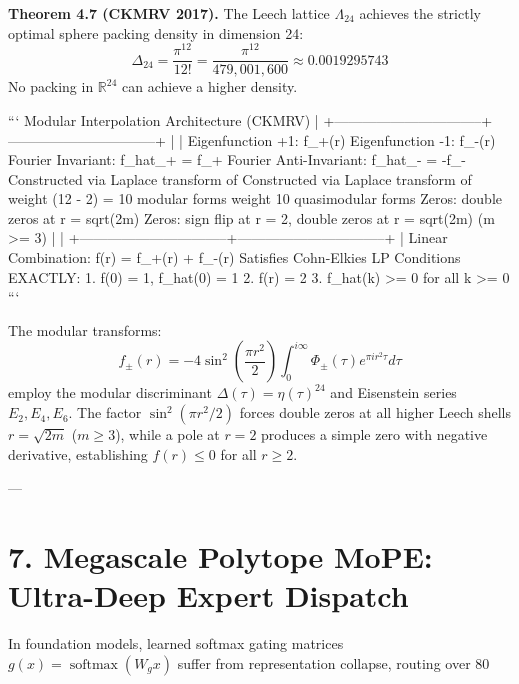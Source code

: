\documentclass[11pt,twoside,openright]{amsbook}
\begin{document}
\textbf{Theorem 4.7 (CKMRV 2017).}
The Leech lattice $\Lambda_{24}$ achieves the strictly optimal sphere packing density in dimension 24:
$$\Delta_{24} = \frac{\pi^{12}}{12!} = \frac{\pi^{12}}{479,001,600} \approx \mathbf{0.0019295743}$$
No packing in $\mathbb{R}^{24}$ can achieve a higher density.

```
                         Modular Interpolation Architecture (CKMRV)
                                             |
            +--------------------------------+--------------------------------+
            |                                                                 |
     Eigenfunction +1: f_+(r)                                          Eigenfunction -1: f_-(r)
  Fourier Invariant: f_hat_+ = f_+                                  Fourier Anti-Invariant: f_hat_- = -f_-
  Constructed via Laplace transform of                              Constructed via Laplace transform of
  weight (12 - 2) = 10 modular forms                                weight 10 quasimodular forms
  Zeros: double zeros at r = sqrt(2m)                               Zeros: sign flip at r = 2,
                                                                    double zeros at r = sqrt(2m) (m >= 3)
            |                                                                 |
            +--------------------------------+--------------------------------+
                                             |
                               Linear Combination: f(r) = f_+(r) + f_-(r)
                          Satisfies Cohn-Elkies LP Conditions EXACTLY:
                           1. f(0) = 1, f_hat(0) = 1
                           2. f(r) = 2
                           3. f_hat(k) >= 0 for all k >= 0
```

The modular transforms:
$$f_\pm(r) = -4 \sin^2\left(\frac{\pi r^2}{2}\right) \int_0^{i\infty} \Phi_\pm(\tau) e^{\pi i r^2 \tau} d\tau$$
employ the modular discriminant $\Delta(\tau) = \eta(\tau)^{24}$ and Eisenstein series $E_2, E_4, E_6$. The factor $\sin^2(\pi r^2 / 2)$ forces double zeros at all higher Leech shells $r = \sqrt{2m}$ ($m \ge 3$), while a pole at $r = 2$ produces a simple zero with negative derivative, establishing $f(r) \le 0$ for all $r \ge 2$.

---

\section{7. Megascale Polytope MoPE: Ultra-Deep Expert Dispatch}

In foundation models, learned softmax gating matrices $g(x) = \operatorname{softmax}(W_g x)$ suffer from representation collapse, routing over 80%
\end{document}
